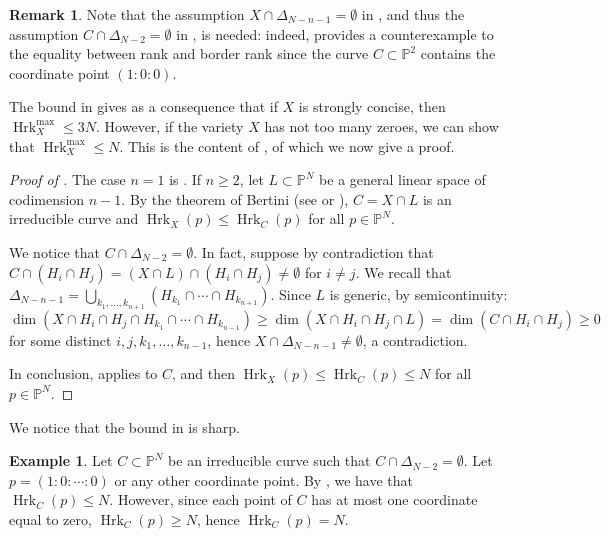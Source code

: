 \documentclass{amsart}
\theoremstyle{plain}
\numberwithin{theorem}{section}
\theoremstyle{definition}
\newtheorem{remark}[theorem]{Remark}
\newtheorem{example}[theorem]{Example}
\newcommand{\bbP}{\mathbb{P}}
\newcommand{\Hrk}{\operatorname{Hrk}}
\begin{document}
\begin{remark}
    Note that the assumption $X \cap \Delta_{N-n-1} = \emptyset$ in , and thus the assumption $C\cap \Delta_{N-2} = \emptyset$ in , is needed: indeed,  provides a counterexample to the equality between rank and border rank since the curve $C \subset \bbP^2$ contains the coordinate point $(1:0:0)$. 
\end{remark}

The bound in  gives as a consequence that if $X$ is strongly concise, then $\Hrk_X^{\max}\leq 3N$. However, if the variety $X$ has not too many zeroes, we can show that $\Hrk_X^{\max}\leq N$. This is the content of , of which we now
give a proof.

\begin{proof}[Proof of ]
    The case $n = 1$ is . If $n \geq 2$, let $L \subset \bbP^N$ be a general linear space of codimension $n-1$. By the theorem of Bertini (see \cite[Theorem 3.3.1]{lazarsfeldpositivity} or \cite[Section I.6]{jouanolou1983theoremes}), $C = X \cap L$ is an irreducible curve and $\Hrk_X(p) \leq \Hrk_C(p)$ for all $p \in \bbP^N$. 
    
    We notice that $C \cap \Delta_{N-2} = \emptyset$. In fact, suppose by contradiction that $C \cap (H_i \cap H_j) = (X \cap L) \cap (H_i \cap H_j) \neq \emptyset$ for $i \neq j$. We recall that $\Delta_{N-n-1} = \bigcup_{k_1,\ldots, k_{n+1}} (H_{k_1} \cap \cdots \cap H_{k_{n+1}})$. Since $L$ is generic, by semicontinuity:
    \[
        \dim( X \cap H_i \cap H_j \cap H_{k_1} \cap \cdots \cap H_{k_{n-1}}) \geq \dim(X \cap H_i \cap H_j \cap L) = \dim (C \cap H_i \cap H_j) \geq 0
    \]
    for some distinct $i,j,k_1,\ldots,k_{n-1}$, hence $X \cap \Delta_{N - n -1} \neq \emptyset$, a contradiction.
    
    In conclusion,  applies to $C$, and then $\Hrk_X(p) \leq \Hrk_C(p) \leq N$ for all $p \in \bbP^N$.
\end{proof}

We notice that the bound in  is sharp.

\begin{example}\label{example:sharp}
Let $C\subset \bbP^N$ be an irreducible curve such that $C\cap \Delta_{N-2}=\emptyset$. Let $p = (1:0:\cdots :0)$ or any other coordinate point. By , we have that $\Hrk_C(p) \leq N$. However, since each point of $C$ has at most one coordinate equal to zero, $\Hrk_C(p) \geq N$, hence $\Hrk_C(p) = N$.
\end{example}



\end{document}
